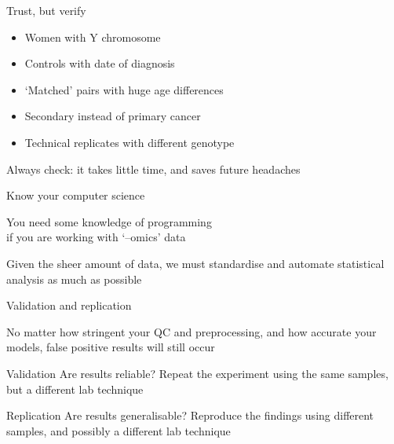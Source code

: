 \begin{frame}[t]{Trust, but verify}
    \begin{itemize}
        \item Women with Y chromosome
        \item Controls with date of diagnosis
        \item `Matched' pairs with huge age differences
        \item Secondary instead of primary cancer
        \item Technical replicates with different genotype
    \end{itemize}
    \vfill
    \begin{center}
        \alert{Always check}: it takes little time, and saves future headaches
    \end{center}
\end{frame}

\begin{frame}[t]{Know your computer science}
    \begin{center}
        You need some \alert{knowledge of programming}\\
        if you are working with `--omics' data
    \end{center}
    \vfill
    Given the sheer amount of data, we must
    \alert{standardise and automate statistical analysis} as much as possible
\end{frame}

\begin{frame}[t]{Validation and replication}
    \begin{center}
        No matter how stringent your QC and preprocessing, and how accurate your
        models, \alert{false positive results} will still occur
    \end{center}
    \vfill
    \begin{block}{Validation}
        Are results \alert{reliable}?
        Repeat the experiment using the same samples, but a different lab
        technique
    \end{block}
    \begin{block}{Replication}
        Are results \alert{generalisable}?
        Reproduce the findings using different samples, and possibly a different
        lab technique
    \end{block}
\end{frame}

